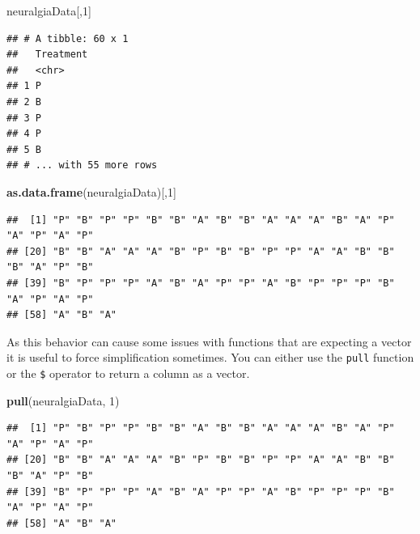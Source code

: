 \documentclass[
]{book}
\newenvironment{Shaded}{\begin{snugshade}}{\end{snugshade}}
\newcommand{\DecValTok}[1]{\textcolor[rgb]{0.00,0.00,0.81}{#1}}
\newcommand{\KeywordTok}[1]{\textcolor[rgb]{0.13,0.29,0.53}{\textbf{#1}}}
\newcommand{\NormalTok}[1]{#1}
\newcommand{\OperatorTok}[1]{\textcolor[rgb]{0.81,0.36,0.00}{\textbf{#1}}}
\theoremstyle{definition}
\theoremstyle{definition}
\theoremstyle{definition}
\theoremstyle{remark}
\begin{document}
\begin{Shaded}
\begin{Highlighting}[]
\NormalTok{neuralgiaData[,}\DecValTok{1}\NormalTok{]}
\end{Highlighting}
\end{Shaded}

\begin{verbatim}
## # A tibble: 60 x 1
##   Treatment
##   <chr>    
## 1 P        
## 2 B        
## 3 P        
## 4 P        
## 5 B        
## # ... with 55 more rows
\end{verbatim}

\begin{Shaded}
\begin{Highlighting}[]
\KeywordTok{as.data.frame}\NormalTok{(neuralgiaData)[,}\DecValTok{1}\NormalTok{]}
\end{Highlighting}
\end{Shaded}

\begin{verbatim}
##  [1] "P" "B" "P" "P" "B" "B" "A" "B" "B" "A" "A" "A" "B" "A" "P" "A" "P" "A" "P"
## [20] "B" "B" "A" "A" "A" "B" "P" "B" "B" "P" "P" "A" "A" "B" "B" "B" "A" "P" "B"
## [39] "B" "P" "P" "P" "A" "B" "A" "P" "P" "A" "B" "P" "P" "P" "B" "A" "P" "A" "P"
## [58] "A" "B" "A"
\end{verbatim}

As this behavior can cause some issues with functions that are expecting a vector it is useful to force simplification sometimes. You can either use the \texttt{pull} function or the \texttt{\$} operator to return a column as a vector.

\begin{Shaded}
\begin{Highlighting}[]
\KeywordTok{pull}\NormalTok{(neuralgiaData, }\DecValTok{1}\NormalTok{)}
\end{Highlighting}
\end{Shaded}

\begin{verbatim}
##  [1] "P" "B" "P" "P" "B" "B" "A" "B" "B" "A" "A" "A" "B" "A" "P" "A" "P" "A" "P"
## [20] "B" "B" "A" "A" "A" "B" "P" "B" "B" "P" "P" "A" "A" "B" "B" "B" "A" "P" "B"
## [39] "B" "P" "P" "P" "A" "B" "A" "P" "P" "A" "B" "P" "P" "P" "B" "A" "P" "A" "P"
## [58] "A" "B" "A"
\end{verbatim}

\begin{Shaded}
\end{Shaded}
\end{document}

